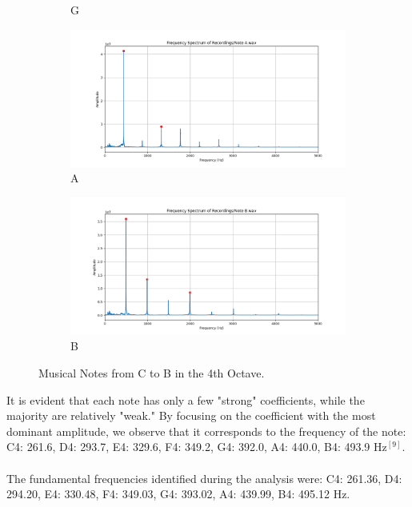 \documentclass{article}
\begin{document}
\begin{itemize}
\begin{figure}[H]
\begin{subfigure}{0.49\textwidth}
        \caption{G}
        \label{fig:G4_Note}
    \end{subfigure}
    \begin{subfigure}{0.49\textwidth}
        \includegraphics[width=\textwidth]{A Note.png}
        \caption{A}
        \label{fig:A4_Note}
    \end{subfigure}
    \begin{subfigure}{0.49\textwidth}
        \includegraphics[width=\textwidth]{B Note.png}
        \caption{B}
        \label{fig:B4_Note}
    \end{subfigure}
    \caption{Musical Notes from C to B in the 4th Octave.}
    \label{fig:musical_notes}
    \end{figure}

It is evident that each note has only a few "strong" coefficients, while the majority are relatively "weak." By focusing on the coefficient with the most dominant amplitude, we observe that it corresponds to the frequency of the note: \\ C4: 261.6, D4: 293.7, E4: 329.6, F4: 349.2, G4: 392.0, A4: 440.0, B4: 493.9 Hz$^{[9]}$.\\\\
The fundamental frequencies identified during the analysis were:
C4: 261.36, D4: 294.20, E4: 330.48, F4: 349.03, G4: 393.02, A4: 439.99, B4: 495.12 Hz.


\end{itemize}
\end{document}
